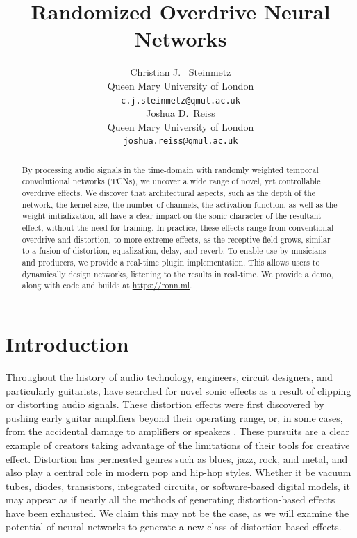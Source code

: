 \documentclass{article}
\title{Randomized Overdrive Neural Networks}
\author{%
  Christian J. ~Steinmetz \\
  Queen Mary University of London\\
  \texttt{c.j.steinmetz@qmul.ac.uk} \\
  \And
  Joshua D.~Reiss \\
  Queen Mary University of London \\
  \texttt{joshua.reiss@qmul.ac.uk} \\
}
\begin{document}
\maketitle

\begin{abstract}
By processing audio signals in the time-domain with randomly weighted temporal convolutional networks (TCNs),
we uncover a wide range of novel, yet controllable overdrive effects.
We discover that architectural aspects, such as the depth of the network, 
the kernel size, the number of channels, the activation function, as well as the weight initialization, 
all have a clear impact on the sonic character of the resultant effect, without the need for training. 
In practice, these effects range from conventional overdrive and distortion,
to more extreme effects, as the receptive field grows, similar to a fusion of distortion, equalization, delay, and reverb.  
To enable use by musicians and producers, we provide a real-time plugin implementation.
This allows users to dynamically design networks, listening to the results in real-time.
We provide a demo, along with code and builds at \url{https://ronn.ml}.
\end{abstract} 



\section{Introduction}

Throughout the history of audio technology, engineers, circuit designers, 
and particularly guitarists, have searched for novel sonic effects as a result of clipping or distorting audio signals. 
These distortion effects were first discovered by pushing early guitar amplifiers beyond their operating range, 
or, in some cases, from the accidental damage to amplifiers or speakers \cite{shepherd2003distortion}. 
These pursuits are a clear example of creators taking advantage of the limitations of their tools for creative effect.
Distortion has permeated genres such as blues, jazz, rock, and metal, and also play a central role in modern pop and hip-hop styles.
Whether it be vacuum tubes, diodes, transistors, integrated circuits, or software-based digital models,
it may appear as if nearly all the methods of generating distortion-based effects have been exhausted.
We claim this may not be the case, as we will examine the potential of neural networks to generate a new class of distortion-based effects. 
\end{document}
